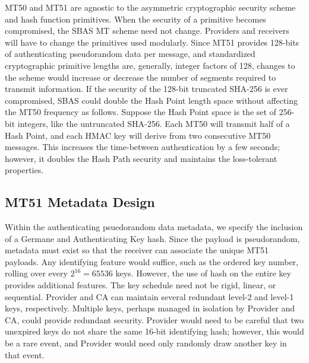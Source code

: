 \documentclass[APA,STIX1COL]{IONjournal/ION-APA Template}
\begin{document}
	MT50 and MT51 are agnostic to the asymmetric cryptographic security scheme and hash function primitives.
	When the security of a primitive becomes compromised, the SBAS MT scheme need not change.
	Providers and receivers will have to change the primitives used modularly.
	Since MT51 provides 128-bits of authenticating pseudorandom data per message, and standardized cryptographic primitive lengths are, generally, integer factors of 128, changes to the scheme would increase or decrease the number of segments required to transmit information.
	If the security of the 128-bit truncated SHA-256 is ever compromised, SBAS could double the Hash Point length space without affecting the MT50 frequency as follows.
	Suppose the Hash Point space is the set of 256-bit integers, like the untruncated SHA-256.
	Each MT50 will transmit half of a Hash Point, and each HMAC key will derive from two consecutive MT50 messages.
	This increases the time-between authentication by a few seconds; however, it doubles the Hash Path security and maintains the loss-tolerant properties.

	\subsection{MT51 Metadata Design} \label{sub:metadata_design}

		Within the authenticating psuedorandom data metadata, we specify the inclusion of a Germane and Authenticating Key hash.
		Since the payload is pseudorandom, metadata must exist so that the receiver can associate the unique MT51 payloads.
		Any identifying feature would suffice, such as the ordered key number, rolling over every $2^{16} = 65536$ keys.
		However, the use of hash on the entire key provides additional features.
		The key schedule need not be rigid, linear, or sequential.
		Provider and CA can maintain several redundant level-2 and level-1 keys, respectively.
		Multiple keys, perhaps managed in isolation by Provider and CA, could provide redundant security.
		Provider would need to be careful that two unexpired keys do not share the same 16-bit identifying hash; however, this would be a rare event, and Provider would need only randomly draw another key in that event.
\end{document}
